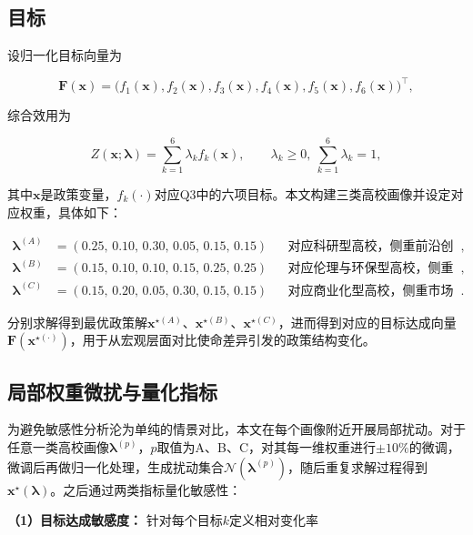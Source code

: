 \documentclass{mcmthesis}
\begin{document}
\subsection{目标}

\noindent 设归一化目标向量为

\[\mathbf{F}(\mathbf{x})=\big(f_1(\mathbf{x}),f_2(\mathbf{x}),f_3(\mathbf{x}),f_4(\mathbf{x}),f_5(\mathbf{x}),f_6(\mathbf{x})\big)^\top,\]

\noindent 综合效用为

\begin{equation}Z(\mathbf{x};\boldsymbol{\lambda})=\sum_{k=1}^{6}\lambda_k f_k(\mathbf{x}),\qquad\lambda_k\ge 0,\ \sum_{k=1}^{6}\lambda_k=1,\label{eq:lambda_utility}\end{equation}

\noindent 其中$\mathbf{x}$是政策变量，$f_k(\cdot)$对应Q3中的六项目标。本文构建三类高校画像并设定对应权重，具体如下：

\[
\begin{aligned}
\boldsymbol{\lambda}^{(A)}&=(0.25,\,0.10,\,0.30,\,0.05,\,0.15,\,0.15)
&&\text{对应科研型高校，侧重前沿创新与资源节约},\\
\boldsymbol{\lambda}^{(B)}&=(0.15,\,0.10,\,0.10,\,0.15,\,0.25,\,0.25)
&&\text{对应伦理与环保型高校，侧重限制AI使用、强化治理与可持续发展},\\
\boldsymbol{\lambda}^{(C)}&=(0.15,\,0.20,\,0.05,\,0.30,\,0.15,\,0.15)
&&\text{对应商业化型高校，侧重市场敏感、创收导向并兼顾合规要求}.
\end{aligned}
\]

\noindent 分别求解得到最优政策解$\mathbf{x}^{\star(A)}$、$\mathbf{x}^{\star(B)}$、$\mathbf{x}^{\star(C)}$，进而得到对应的目标达成向量$\mathbf{F}(\mathbf{x}^{\star(\cdot)})$，用于从宏观层面对比使命差异引发的政策结构变化。

\noindent\subsection{局部权重微扰与量化指标}

\noindent 为避免敏感性分析沦为单纯的情景对比，本文在每个画像附近开展局部扰动。对于任意一类高校画像$\boldsymbol{\lambda}^{(p)}$，$p$取值为A、B、C，对其每一维权重进行$\pm10\%$的微调，微调后再做归一化处理，生成扰动集合$\mathcal{N}(\boldsymbol{\lambda}^{(p)})$，随后重复求解过程得到$\mathbf{x}^\star(\boldsymbol{\lambda})$。之后通过两类指标量化敏感性：

\noindent\textbf{（1）目标达成敏感度：} 针对每个目标$k$定义相对变化率
\end{document}
